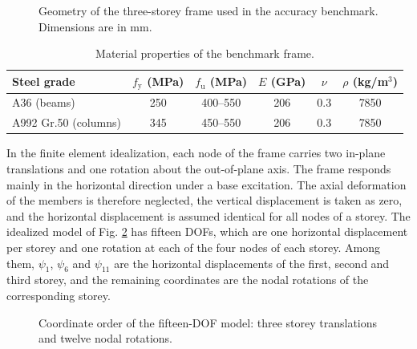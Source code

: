 \documentclass[a4paper,fleqn,review,12pt]{cas-sc}
\numberwithin{equation}{section}
\newcommand{\rev}[1]{{\color{red}#1}}
\begin{document}
\begin{figure}[htbp]
	\centering
	
	\caption{\rev{Geometry of the three-storey frame used in the accuracy benchmark. Dimensions are in mm.}}
	\label{fig:benchmark-geometry}
\end{figure}

\begin{table}[htbp]
	\centering
	\caption{Material properties of the benchmark frame.}
	\label{tab:materials}
	\begin{tabular}{lccccc}
		\toprule
		Steel grade & \(f_{\mathrm{y}}\) (MPa) & \(f_{\mathrm{u}}\) (MPa) & \(E\) (GPa) & \(\nu\) & \(\rho\) (kg/m\(^{3}\))\\
		\midrule
		A36 (beams)      & 250 & 400--550 & \rev{206} & 0.3 & 7850\\
		A992 Gr.50 (columns) & 345 & 450--550 & \rev{206} & 0.3 & 7850\\
		\bottomrule
	\end{tabular}
\end{table}

In the finite element idealization, each node of the frame carries two in-plane translations and one rotation about the out-of-plane axis. The frame responds mainly in the horizontal direction under a base excitation. The axial deformation of the members is therefore neglected, the vertical displacement is taken as zero, and the horizontal displacement is assumed identical for all nodes of a storey. The idealized model of Fig. \ref{fig:dof-idealization} has fifteen DOFs, which are one horizontal displacement per storey and one rotation at each of the four nodes of each storey. Among them, \(\psi_{1}\), \(\psi_{6}\) and \(\psi_{11}\) are the horizontal displacements of the first, second and third storey, and the remaining coordinates are the nodal rotations of the corresponding storey.

\begin{figure}[htbp]
	\centering
	
	\caption{\rev{Coordinate order of the fifteen-DOF model: three storey translations and twelve nodal rotations.}}
	\label{fig:dof-idealization}
\end{figure}
\end{document}
